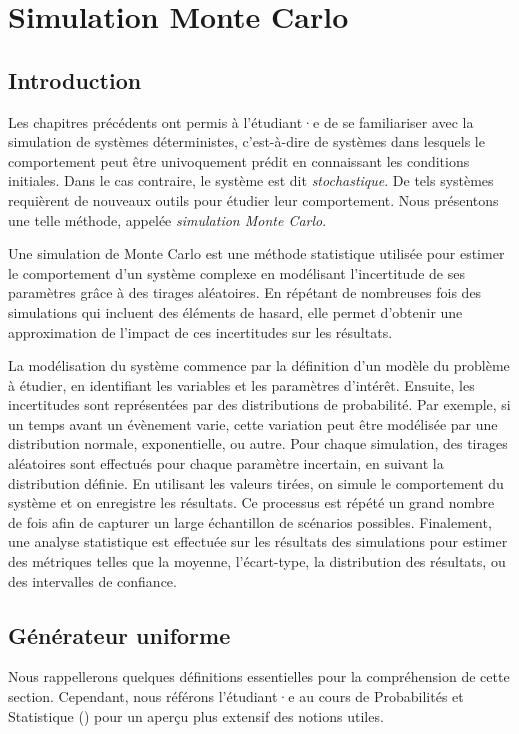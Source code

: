 \chapter{Simulation Monte Carlo}
    \section{Introduction}
        Les chapitres précédents ont permis à l'étudiant·e de se familiariser avec la simulation de systèmes déterministes, c'est-à-dire de systèmes dans lesquels le comportement peut être univoquement prédit en connaissant les conditions initiales. Dans le cas contraire, le système est dit \textit{stochastique}. De tels systèmes requièrent de nouveaux outils pour étudier leur comportement. Nous présentons une telle méthode, appelée \textit{simulation Monte Carlo}.
        
        Une simulation de Monte Carlo est une méthode statistique utilisée pour estimer le comportement d'un système complexe en modélisant l'incertitude de ses paramètres grâce à des tirages aléatoires. En répétant de nombreuses fois des simulations qui incluent des éléments de hasard, elle permet d'obtenir une approximation de l'impact de ces incertitudes sur les résultats. 
        
        La modélisation du système commence par la définition d'un modèle du problème à étudier, en identifiant les variables et les paramètres d'intérêt. Ensuite, les incertitudes sont représentées par des distributions de probabilité. Par exemple, si un temps avant un évènement varie, cette variation peut être modélisée par une distribution normale, exponentielle, ou autre. Pour chaque simulation, des tirages aléatoires sont effectués pour chaque paramètre incertain, en suivant la distribution définie. En utilisant les valeurs tirées, on simule le comportement du système et on enregistre les résultats. Ce processus est répété un grand nombre de fois afin de capturer un large échantillon de scénarios possibles. Finalement, une analyse statistique est effectuée sur les résultats des simulations pour estimer des métriques telles que la moyenne, l'écart-type, la distribution des résultats, ou des intervalles de confiance.

    \section{Générateur uniforme}
        Nous rappellerons quelques définitions essentielles pour la compréhension de cette section. Cependant, nous référons l'étudiant·e au cours de Probabilités et Statistique (\cite{mathf315_1, mathf315_2}) pour un aperçu plus extensif des notions utiles.


